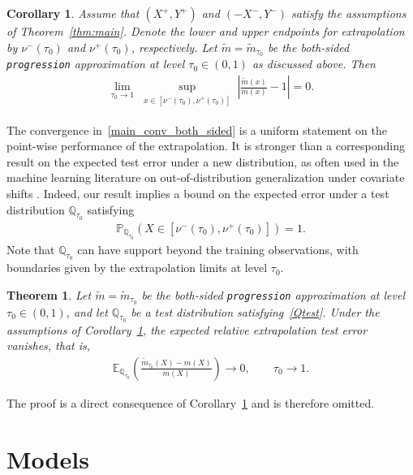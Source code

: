 \documentclass{statsoc}
\newtheorem{theorem}{Theorem}
\newtheorem{corollary}{Corollary}
\theoremstyle{break}
\newcommand{\Qtesttau}{\mathbb{Q}_{\tauzero}}
\newcommand{\tauzero}{\tau_0}
\begin{document}
\begin{corollary}\label{cor:main}
	Assume that $(X^+, Y^+)$ and $(-X^-, Y^-)$
	satisfy the assumptions of Theorem~\ref{thm:main}. Denote the lower and upper endpoints for extrapolation by $\nu^-(\tau_0)$ and $\nu^+(\tau_0)$, respectively. 
	Let $\tilde m = \tilde m_{\tauzero}$ be the both-sided \texttt{progression} approximation at level $\tauzero\in(0,1)$ as discussed above. Then
	\begin{align}\label{main_conv_both_sided}
		\lim_{\tau_0 \to 1} \sup_{
	   \substack{
			x \in [\nu^-(\tau_0), \nu^+(\tau_0)]}}
			 \left|\frac{\tilde m(x)}{m(x)} - 1 \right| = 0.
	\end{align}
\end{corollary}

The convergence in~\eqref{main_conv_both_sided} is a uniform statement on the point-wise performance of the extrapolation.
It is stronger than a corresponding result on the expected test error under a new distribution, as often used in the machine learning literature on out-of-distribution generalization under covariate shifts \citep[e.g.,][]{ma:pathak:wainwright:2023}.
Indeed, our result implies a bound on the expected error under 
a test distribution $\Qtesttau$ satisfying 
\begin{align}\label{Qtest}
	\mathbb P_{\Qtesttau}\left(X \in  [\nu^-(\tau_0), \nu^+(\tau_0)]\right) = 1.
\end{align}
Note that $\Qtesttau$ can have support beyond the training observations, with boundaries given by the extrapolation limits at level $\tauzero$. 


\begin{theorem}\label{thm2}
	Let $\tilde m = \tilde m_{\tauzero}$ be the both-sided \texttt{progression} approximation at level $\tauzero\in(0,1)$, and let $\Qtesttau$ be a test distribution satisfying~\eqref{Qtest}. Under the assumptions of Corollary~\ref{cor:main}, the expected relative extrapolation test error vanishes, that is,
	\begin{align}
		\mathbb E_{\Qtesttau} \left( \frac{\tilde m_{\tauzero}(X)- m(X)}{m(X)} \right) \to 0, \qquad \tauzero \to 1.
	\end{align}
\end{theorem}
The proof is a direct consequence of Corollary~\ref{cor:main} and is therefore omitted.

\section{Models}\label{sub:sec:examples}
\end{document}
